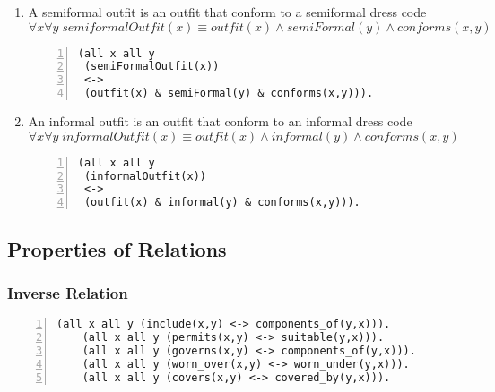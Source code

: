 \documentclass[paper=a4, fontsize=11pt]{scrartcl} %
\numberwithin{equation}{section} %
\numberwithin{figure}{section} %
\numberwithin{table}{section} %
\begin{document}
\begin{enumerate}
	
	\item A semiformal outfit is an outfit that conform to a semiformal dress code
	\begin{equation*}
		\forall x \forall y \; semiformalOutfit(x) \equiv outfit(x) \land semiFormal(y) \land conforms(x,y)
	\end{equation*}
	\begin{Verbatim}[frame=lines,gobble=2,numbers=left]
 (all x all y 
 (semiFormalOutfit(x))
 <->
 (outfit(x) & semiFormal(y) & conforms(x,y))).
	\end{Verbatim}


	\item An informal outfit is an outfit that conform to an informal dress code
	\begin{equation*}
		\forall x \forall y \; informalOutfit(x) \equiv outfit(x) \land informal(y) \land conforms(x,y)
	\end{equation*}
	\begin{Verbatim}[frame=lines,gobble=2,numbers=left]
 (all x all y 
 (informalOutfit(x))
 <->
 (outfit(x) & informal(y) & conforms(x,y))).
	\end{Verbatim}	


\end{enumerate}
\clearpage

\subsection{Properties of Relations}
\subsubsection{Inverse Relation}
	\begin{Verbatim}[frame=lines,gobble=2,numbers=left]
	(all x all y (include(x,y) <-> components_of(y,x))).
	(all x all y (permits(x,y) <-> suitable(y,x))).
	(all x all y (governs(x,y) <-> components_of(y,x))).
	(all x all y (worn_over(x,y) <-> worn_under(y,x))).
	(all x all y (covers(x,y) <-> covered_by(y,x))).
	\end{Verbatim}	
	
	
\end{document}

